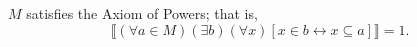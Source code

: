 $M$ satisfies the Axiom of Powers; that is,
$$
\llbracket (\forall a \in M)(\exists b)(\forall x)[x \in b \leftrightarrow x \subseteq a] \rrbracket = 1.
$$
